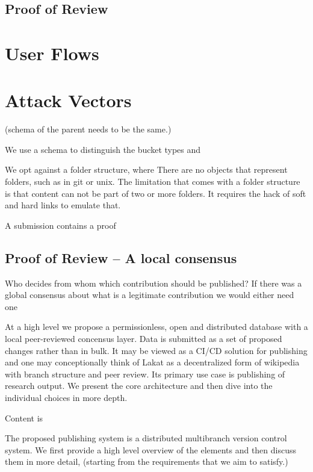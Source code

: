 \documentclass[14pt]{article}
\newcommand{\remark}[1]{{\color{purple} (#1)}}
\begin{document}
\subsection{Proof of Review}
\label{ssc:consensus}


\section{User Flows}

\section{Attack Vectors}

\remark{schema of the parent needs to be the same.}

We use a schema to distinguish the bucket types and  

We opt against a folder structure, where
There are no objects that represent folders, such as in git or unix. The limitation that comes with a folder structure is that content can not be part of two or more folders. It requires the hack of soft and hard links to emulate that.





A submission contains a proof 



\subsection{Proof of Review -- A local consensus}

Who decides from whom which contribution should be published? If there was a global consensus about what is a legitimate contribution we would either need one 


At a high level we propose a permissionless, open and distributed database with a local peer-reviewed concensus layer. Data is submitted as a set of proposed changes rather than in bulk. It may be viewed as a CI/CD solution for publishing and one may conceptionally think of Lakat as a decentralized form of wikipedia with branch structure and peer review. Its primary use case is publishing of research output. We present the core architecture and then dive into the individual choices in more depth. 



Content is 



The proposed publishing system is a distributed multibranch version control system. We first provide a high level overview of the elements and then discuss them in more detail, \remark{starting from the requirements that we aim to satisfy.}
\end{document}
